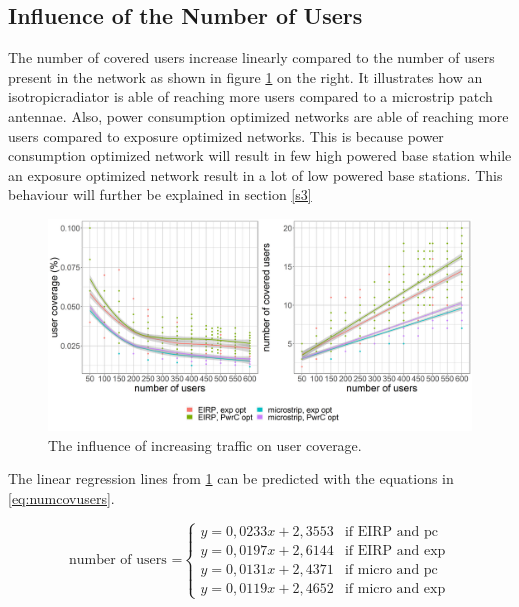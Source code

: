 \FloatBarrier
\subsection{Influence of the Number of Users}
\label{s2b}

The number of covered users increase linearly compared to the number of users present in the network as shown in figure 
\ref{fig:s2uvsnumcovusers} on the right. It illustrates how an \gls{isotropicradiator} is able of reaching more users 
compared to a microstrip patch antennae.
Also, power consumption optimized networks are able of reaching more users compared to exposure optimized networks.
This is because power consumption optimized network will result in few high powered base station while an 
exposure optimized network result in a lot of low powered base stations. This behaviour will further be explained in section \ref{s3}

\begin{figure}[h!]
  \includegraphics[width=\textwidth]{../results/s2/uvsnumdronesAndCov.png}
  \caption{The influence of increasing traffic on user coverage.}
  \label{fig:s2uvsnumcovusers}
\end{figure}

The linear regression lines from \ref{fig:s2uvsnumcovusers} can be predicted with the equations in \ref{eq:numcovusers}.

\begin{equation}
\text{number of users =}
    \begin{cases}
      y = 0,0233x + 2,3553 & \text{if EIRP and pc}\\
      y = 0,0197x + 2,6144  & \text{if EIRP and exp}\\
      y = 0,0131x + 2,4371  & \text{if micro and pc}\\
      y = 0,0119x + 2,4652  & \text{if micro and exp}
    \end{cases} 
    \label{eq:numcovusers}      
\end{equation}

